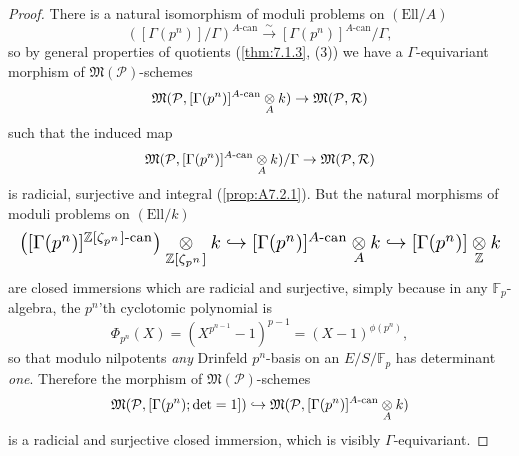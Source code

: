 \begin{proof}
There is a natural isomorphism of moduli problems on $(\mathrm{Ell}/A)$
\[
([\Gamma(p^n)]/\Gamma)^{A\text{-can}} \xrightarrow{\ \sim\ } [\Gamma(p^n)]^{A\text{-can}}/\Gamma ,
\]
so by general properties of quotients (\ref{thm:7.1.3}, (3)) we have a $\Gamma$-equivariant morphism of $\mathfrak{M}(\mathcal{P})$-schemes
\[
\mathfrak{M}(\mathcal{P}, [\Gamma(p^n)]^{A\text{-can}} \underset{A}{\otimes} k) \to \mathfrak{M}(\mathcal{P}, \mathcal{R})
\]
such that the induced map
\[
\mathfrak{M}(\mathcal{P}, [\Gamma(p^n)]^{A\text{-can}} \underset{A}{\otimes} k)/\Gamma \to \mathfrak{M}(\mathcal{P}, \mathcal{R})
\]
is radicial, surjective and integral (\ref{prop:A7.2.1}). But the natural morphisms of moduli problems on $(\mathrm{Ell}/k)$
\[
\resizebox{\linewidth}{!}{$\displaystyle
\begin{array}{@{}l@{}}
\left([\Gamma(p^n)]^{\mathbb{Z}[\zeta_{p^n}]\text{-can}}\right) \tens{\mathbb{Z}[\zeta_{p^n}]} k \hookrightarrow [\Gamma(p^n)]^{A\text{-can}} \tens{A} k \hookrightarrow [\Gamma(p^n)] \tens{\mathbb{Z}} k
\end{array}$}
\]
are closed immersions which are radicial and surjective, simply because in any $\mathbb{F}_p$-algebra, the $p^n$'th cyclotomic polynomial is
\[
\Phi_{p^n}(X) = (X^{p^{n-1}}-1)^{p-1} = (X-1)^{\phi(p^n)} ,
\]
so that modulo nilpotents \emph{any} Drinfeld $p^n$-basis on an $E/S/\mathbb{F}_p$ has determinant \emph{one}. Therefore the morphism of $\mathfrak{M}(\mathcal{P})$-schemes
\[
\mathfrak{M}(\mathcal{P}, [\Gamma(p^n); \det = 1]) \hookrightarrow \mathfrak{M}(\mathcal{P}, [\Gamma(p^n)]^{A\text{-can}} \underset{A}{\otimes} k)
\]
is a radicial and surjective closed immersion, which is visibly $\Gamma$-equivariant.
\end{proof}

